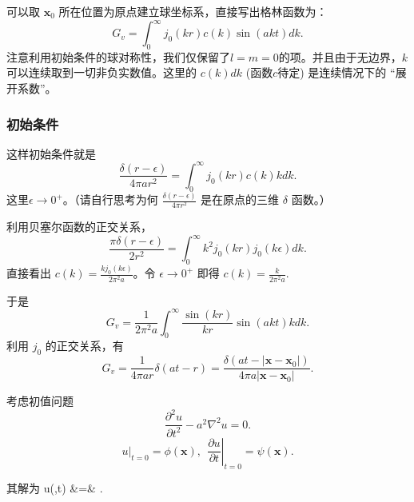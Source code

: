 \documentclass[CJK]{beamer}
\begin{document}
\begin{frame}  
  可以取 $\mathbf{x}_0$ 所在位置为原点建立球坐标系，直接写出格林函数为：
  $$G_v=  \int_0^\infty j_0(kr) c(k)\sin(akt) dk.$$
  {\scriptsize 注意利用初始条件的球对称性，我们仅保留了$l=m=0$的项。并且由于无边界，$k$可以连续取到一切非负实数值。这里的 $c(k)dk$ (函数$c$待定) 是连续情况下的 “展开系数”。}
\end{frame}

\begin{frame}
  \frametitle{初始条件}
  这样初始条件就是
  $$\frac{\delta(r-\epsilon)}{4\pi a r^2} = \int_0^\infty j_0(kr) c(k) kdk .$$
  这里$\epsilon\rightarrow 0^+$。（请自行思考为何 $\frac{\delta(r-\epsilon)}{4\pi r^2}$ 是在原点的三维 $\delta$ 函数。）

  利用贝塞尔函数的正交关系，
  $$\frac{\pi\delta(r-\epsilon)}{2r^2} = \int_0^\infty k^2j_0(kr)j_0(k\epsilon)dk.$$
  直接看出 $c(k) = \frac{kj_0(k\epsilon)}{2\pi^2 a} $。令 $\epsilon\rightarrow 0^+$ 即得 $c(k) = \frac{k}{2\pi^2a}$.
\end{frame}

\begin{frame}
  于是
  $$G_v=  \frac{1}{2\pi^2a} \int_0^\infty \frac{\sin(kr)}{kr} \sin(akt) k dk.$$
  利用 $j_0$ 的正交关系，有
  $$G_v=  \frac{1}{4\pi ar} \delta(at-r) = \frac{\delta(at-|\mathbf{x}-\mathbf{x}_0|)}{4\pi a|\mathbf{x}-\mathbf{x}_0|}.$$
\end{frame}


\begin{frame}
  考虑初值问题
  $$\frac{\partial^2u}{\partial t^2}-a^2\nabla^2u = 0.$$
  $$ \left.u\right\vert_{t=0} = \phi(\mathbf{x}),\ \ \left.\frac{\partial u}{\partial t}\right\vert_{t=0} = \psi(\mathbf{x}).$$
\end{frame}

\begin{frame}
  其解为
  \bea
  u(,t) &=&  .\nonumber
  \eea
\end{frame}


\ech
\end{document}
